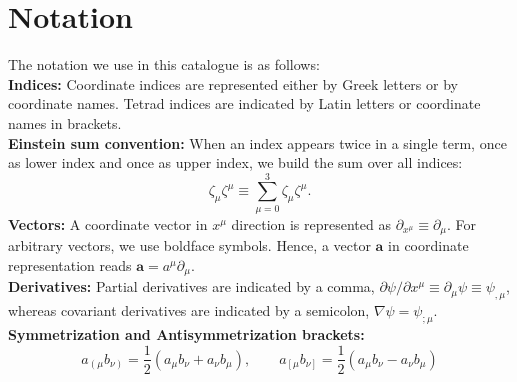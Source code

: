 \documentclass[10pt,twoside,notitlepage,a4paper,fleqn,openbib]{report}
\def\symml{\left(\right.}
\def\symmr{\left.\right)}
\def\antil{\left[\right.}
\def\antir{\left.\right]}
\begin{document}
\section{Notation}
\setcounter{equation}{0}
The notation we use in this catalogue is as follows:\\[0.3em]
{\bf Indices:} Coordinate indices are represented either by Greek letters or by coordinate names. Tetrad indices are indicated by Latin letters or coordinate names in brackets.\\[0.3em]
{\bf Einstein sum convention:} When an index appears twice in a single term, once as lower index and once as upper index, we build the sum over all indices:
\begin{equation}
   \zeta_{\mu}\zeta^{\mu} \equiv \sum\limits_{\mu=0}^{3}\zeta_{\mu}\zeta^{\mu}.
\end{equation}
{\bf Vectors:} A coordinate vector in $x^{\mu}$ direction is represented as $\partial_{x^{\mu}}\equiv\partial_{\mu}$. For arbitrary vectors, we use boldface symbols. Hence, a vector $\mathbf{a}$ in coordinate representation reads $\mathbf{a}=a^{\mu}\partial_{\mu}$.\\[0.3em]
{\bf Derivatives:} Partial derivatives are indicated by a comma, $\partial\psi/\partial x^{\mu}\equiv \partial_{\mu}\psi\equiv \psi_{,\mu}$, whereas covariant derivatives are indicated by a semicolon, $\nabla\psi = \psi_{;\mu}$.\\[0.3em]
{\bf Symmetrization and Antisymmetrization brackets:}
\begin{equation}
  a_{\symml\mu}b_{\nu\symmr} = \frac{1}{2}\left(a_{\mu}b_{\nu}+a_{\nu}b_{\mu}\right),\qquad  a_{\antil\mu}b_{\nu\antir} = \frac{1}{2}\left(a_{\mu}b_{\nu}-a_{\nu}b_{\mu}\right)
\end{equation}

\end{document}
